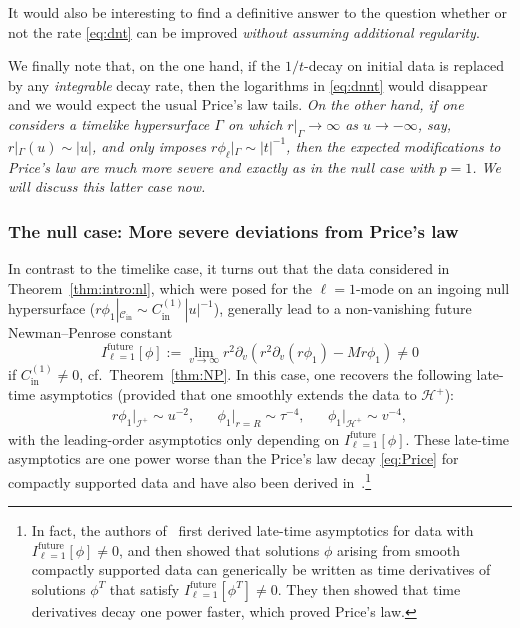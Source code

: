 \documentclass[11pt,english]{article}
\numberwithin{equation}{section}
\theoremstyle{remark}
\theoremstyle{plain}
\theoremstyle{remark}
\newcommand{\pv}{\partial_v}
\renewcommand{\(}{\left(}
\renewcommand{\)}{\right)}
\newcommand{\cc}{C_{\mathrm{in}}^{(1)}}
\begin{document}
It would also be interesting to find a definitive answer to the question whether or not the rate \eqref{eq:dnt} can be improved \textit{without assuming additional regularity}.

We finally note that, on the one hand, if the $1/t$-decay on initial data is replaced by any \textit{integrable} decay rate, then the logarithms in \eqref{eq:dnnt} would disappear and we would expect the usual Price's law tails. 
\textit{On the other hand, if one considers a timelike hypersurface $\Gamma$ on which $r|_{\Gamma}\to \infty$ as $u\to-\infty$, say, $r|_{\Gamma}(u)\sim |u|$, and only imposes $r\phi_\ell|_{\Gamma}\sim |t|^{-1}$, then the expected modifications to Price's law are much more severe and exactly as in the null case with $p=1$. We will discuss this latter case now.}


\subsubsection{The null case: More severe deviations from Price's law}\label{intro:subsecNP2}
In contrast to the timelike case, it turns out that the data considered in Theorem~\ref{thm:intro:nl}, which were posed for the $\ell=1$-mode on an ingoing null hypersurface ($r\phi_1|_{\mathcal{C}_{\mathrm{in}}}\sim \cc|u|^{-1}$), generally lead to a non-vanishing future Newman--Penrose constant 
\begin{equation}
I_{\ell=1}^{\mathrm{future}}[\phi]:=\lim_{v\to\infty} r^2 \pv(r^2\pv(r\phi_1)-Mr\phi_1)\neq0
\end{equation} if $\cc\neq 0$, cf.~Theorem~\ref{thm:NP}.
In this case, one recovers the following late-time asymptotics (provided that one smoothly extends the data to $\mathcal H^+$):
\begin{align}
r\phi_1|_{\mathcal{I}^+}\sim u^{-2}, &&\phi_1|_{r=R}\sim \tau^{-4},&& \phi_1|_{\mathcal{H}^+}\sim v^{-4},
\end{align}
with the leading-order asymptotics only depending on $I_{\ell=1}^{\mathrm{future}}[\phi]$. These late-time asymptotics are one power worse than the Price's law decay \eqref{eq:Price} for compactly supported data and have also been derived in~\cite{AAG21}.\footnote{\label{footnote7}
In fact, the authors of~\cite{AAG21} first derived late-time asymptotics for data with $I_{\ell=1}^{\mathrm{future}}[\phi]\neq 0$, and then showed that solutions $\phi$ arising from smooth compactly supported data can generically be written as time derivatives of solutions $\phi^T$ that satisfy $I_{\ell=1}^{\mathrm{future}}[\phi^T]\neq 0$. They then showed that time derivatives decay one power faster, which proved Price's law. 
}
\end{document}

